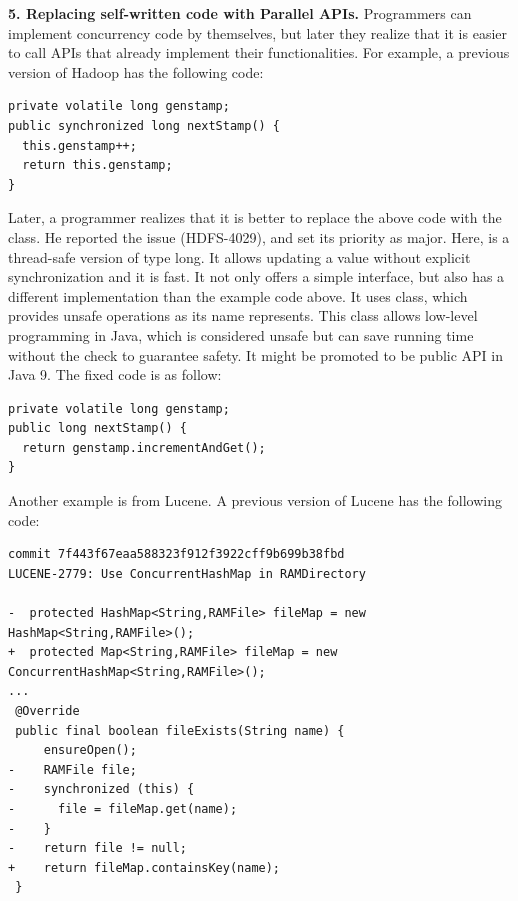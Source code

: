\noindent
\textbf{5. Replacing self-written code with Parallel APIs.} Programmers can implement concurrency code by themselves, but later they realize that it is easier to call APIs that already implement their functionalities. For example, a previous version of Hadoop has the following code:%

%

\begin{lstlisting}
private volatile long genstamp;
public synchronized long nextStamp() {
  this.genstamp++;
  return this.genstamp;
}
\end{lstlisting}

Later, a programmer realizes that it is better to replace the above code with the  class. He reported the issue (HDFS-4029), and set its priority as major. Here,  is a thread-safe version of type long. It allows updating a  value without explicit synchronization and it is fast. It not only offers a simple interface, but also has a different implementation than the example code above. It uses  class, which provides unsafe operations as its name represents. This class allows low-level programming in Java, which is considered unsafe but can save running time without the check to guarantee safety. It might be promoted to be public API in Java 9. The fixed code is as follow:


\begin{lstlisting}
private volatile long genstamp;
public long nextStamp() {
  return genstamp.incrementAndGet();
}
\end{lstlisting}

Another example is from Lucene. A previous version of Lucene has the following code:

\begin{lstlisting}
commit 7f443f67eaa588323f912f3922cff9b699b38fbd
LUCENE-2779: Use ConcurrentHashMap in RAMDirectory

-  protected HashMap<String,RAMFile> fileMap = new HashMap<String,RAMFile>();
+  protected Map<String,RAMFile> fileMap = new ConcurrentHashMap<String,RAMFile>();
...
 @Override
 public final boolean fileExists(String name) {
     ensureOpen();
-    RAMFile file;
-    synchronized (this) {
-      file = fileMap.get(name);
-    }
-    return file != null;
+    return fileMap.containsKey(name);
 }
\end{lstlisting}

